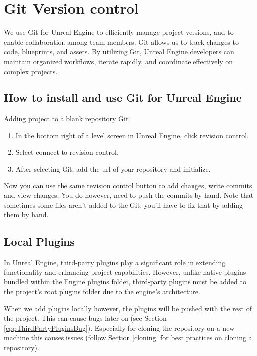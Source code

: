 \documentclass{uva-inf-article}
\begin{document}
\section{Git Version control}
We use Git for Unreal Engine to efficiently manage project versions, and to enable collaboration among team members. Git allows us to track changes to code, blueprints, and assets. By utilizing Git, Unreal Engine developers can maintain organized workflows, iterate rapidly, and coordinate effectively on complex projects.

\subsection{How to install and use Git for Unreal Engine}
Adding project to a blank repository Git:
\begin{enumerate}
    \item In the bottom right of a level screen in Unreal Engine, click revision control.
    \item Select connect to revision control.
    \item After selecting Git, add the url of your repository and initialize.
\end{enumerate}

Now you can use the same revision control button to add changes, write commits and view changes. You do however, need to push the commits by hand.
Note that sometimes some files aren't added to the Git, you'll have to fix that by adding them by hand.

\subsection{Local Plugins}
In Unreal Engine, third-party plugins play a significant role in extending functionality and enhancing project capabilities. However, unlike native plugins bundled within the Engine plugins folder, third-party plugins must be added to the project's root plugins folder due to the engine's architecture.

When we add plugins locally however, the plugins will be pushed with the rest of the project. This can cause bugs later on (see Section \ref{cppThirdPartyPluginsBug}). Especially for cloning the repository on a new machine this causes issues (follow Section \ref{cloning} for best practices on cloning a repository).
\end{document}
